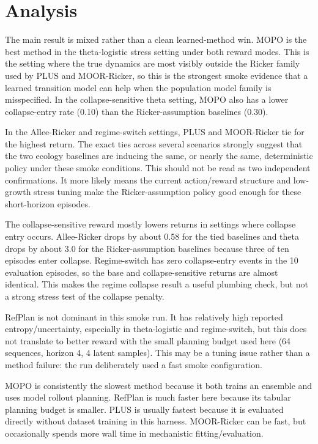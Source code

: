 \documentclass[11pt]{article}
\begin{document}
\section{Analysis}

The main result is mixed rather than a clean learned-method win. MOPO is the
best method in the theta-logistic stress setting under both reward modes. This
is the setting where the true dynamics are most visibly outside the Ricker
family used by PLUS and MOOR-Ricker, so this is the strongest smoke evidence
that a learned transition model can help when the population model family is
misspecified. In the collapse-sensitive theta setting, MOPO also has a lower
collapse-entry rate (0.10) than the Ricker-assumption baselines (0.30).

In the Allee-Ricker and regime-switch settings, PLUS and MOOR-Ricker tie for
the highest return. The exact ties across several scenarios strongly suggest
that the two ecology baselines are inducing the same, or nearly the same,
deterministic policy under these smoke conditions. This should not be read as
two independent confirmations. It more likely means the current action/reward
structure and low-growth stress tuning make the Ricker-assumption policy good
enough for these short-horizon episodes.

The collapse-sensitive reward mostly lowers returns in settings where collapse
entry occurs. Allee-Ricker drops by about 0.58 for the tied baselines and theta
drops by about 3.0 for the Ricker-assumption baselines because three of ten
episodes enter collapse. Regime-switch has zero collapse-entry events in the
10 evaluation episodes, so the base and collapse-sensitive returns are almost
identical. This makes the regime collapse result a useful plumbing check, but
not a strong stress test of the collapse penalty.

RefPlan is not dominant in this smoke run. It has relatively high reported
entropy/uncertainty, especially in theta-logistic and regime-switch, but this
does not translate to better reward with the small planning budget used here
(64 sequences, horizon 4, 4 latent samples). This may be a tuning issue rather
than a method failure: the run deliberately used a fast smoke configuration.

MOPO is consistently the slowest method because it both trains an ensemble and
uses model rollout planning. RefPlan is much faster here because its tabular
planning budget is smaller. PLUS is usually fastest because it is evaluated
directly without dataset training in this harness. MOOR-Ricker can be fast, but
occasionally spends more wall time in mechanistic fitting/evaluation.
\end{document}
